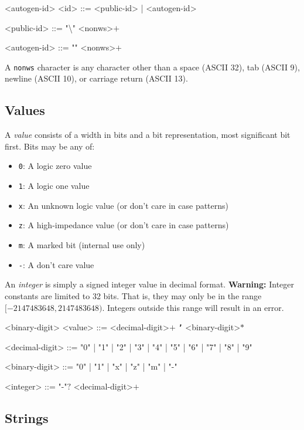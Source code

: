 \begin{indentgrammar}{<autogen-id>}
<id> ::= <public-id> | <autogen-id>

<public-id> ::= "\textbackslash" <nonws>$+$

<autogen-id> ::= "\textdollar" <nonws>$+$
\end{indentgrammar}

A \texttt{nonws} character is any character other than a space (ASCII 32), tab (ASCII 9), newline (ASCII 10), or carriage return (ASCII 13).

\subsection{Values}

A \textit{value} consists of a width in bits and a bit representation, most significant bit first. Bits may be any of:
\begin{itemize}
    \item \texttt{0}: A logic zero value
    \item \texttt{1}: A logic one value
    \item \texttt{x}: An unknown logic value (or don't care in case patterns)
    \item \texttt{z}: A high-impedance value (or don't care in case patterns)
    \item \texttt{m}: A marked bit (internal use only)
    \item \texttt{-}: A don't care value
\end{itemize}

An \textit{integer} is simply a signed integer value in decimal format. \textbf{Warning:} Integer constants are limited to 32 bits. That is, they may only be in the range $[-2147483648, 2147483648)$. Integers outside this range will result in an error.

\begin{indentgrammar}{<binary-digit>}
<value> ::= <decimal-digit>$+$ \texttt{\textbf{'}} <binary-digit>$*$

<decimal-digit> ::= "0" | "1" | "2" | "3" | "4" | "5" | "6" | "7" | "8" | "9"

<binary-digit> ::= "0" | "1" | "x" | "z" | "m" | "-"

<integer> ::= "-"$?$ <decimal-digit>$+$
\end{indentgrammar}

\subsection{Strings}

